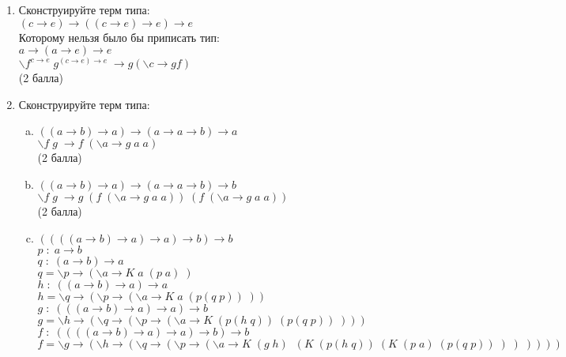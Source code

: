 \documentclass[10pt]{report}
\def\ar{\rightarrow}     %
\def\l{\backslash}       %
\newenvironment{MyList}[1][4pt]{
  \begin{enumerate}[1.]
  \setlength{\parskip}{0pt}
  \setlength{\itemsep}{#1}
}{       
  \end{enumerate}
}
\newcommand{\canonComb}[1]{\boldsymbol{#1}}
\newenvironment{MyList}[1][4pt]{
  \begin{enumerate}[0.]
  \setlength{\parskip}{0pt}
  \setlength{\itemsep}{#1}
}{       
  \end{enumerate}
}
\begin{document}
\begin{MyList}[8pt]
 по Чёрчу :
\begin{enumerate}[a)]
\item $\canonComb{S}\,\canonComb{K}\,\canonComb{K}$\\
$(\l f^{a \ar (b \ar a) \ar a}\; g^{a \ar b \ar a}\; x^{a} \ar f\; x\; (g\; x))(\l x^a\;y^{b\ar a} \ar x)(\l x^a\;y^b \ar x) \; :\; a \ar a$\\
(1 балл)
\item $\canonComb{S}\,\canonComb{K}\,\canonComb{I}$\\
$(\l f^{a \ar a \ar a}\; g^{a \ar a}\; x^{a} \ar f\; x\; (g\; x))(\l x^a\;y^a\ar a} \ar x)(\l x^a \ar x) \; :\; a \ar a$\\
(1 балл)
\end{enumerate}

\item Сконструируйте терм типа:\\
$(c \ar e) \ar ((c \ar e) \ar e) \ar e$\\
Которому нельзя было бы приписать тип:\\
$a \ar (a \ar e) \ar e$\\
$\l f^{c\ar e}\; g^{(c\ar e) \ar e}\; \ar g(\l c \ar gf)$\\
(2 балла)

\item Сконструируйте терм типа:
\begin{enumerate}[a)]
\item $ ((a \ar b) \ar a) \ar (a \ar a \ar b) \ar a$ \\
$\l f\; g\; \ar f\;(\l a \ar g\; a\;a)$\\
(2 балла)
\item $ ((a \ar b) \ar a) \ar (a \ar a \ar b) \ar b$\\
$\l f\; g\; \ar g\; (f\;(\l a \ar g\; a\;a))\; (f\;(\l a \ar g\; a\;a))$\\
(2 балла)
\item $ ((((a \ar b) \ar a) \ar a) \ar b) \ar b$ \\
$p \;:\;a \ar b$\\
$q\;:\;(a \ar b) \ar a$\\
$q = \l p \ar (\l a \ar K\;a\;(p\;a)\;)$\\
$h\;:\;((a \ar b) \ar a) \ar a$\\
$h = \l q \ar(\l p \ar (\l a \ar K\;a\;(p(q\;p))\;))$\\
$g\;:\;(((a \ar b) \ar a) \ar a) \ar b$\\
$g = \l h \ar( \l q \ar(\l p \ar (\l a \ar K\; (p(h\;q))\;(p(q\;p))\;)))$\\
$f\;:\;((((a \ar b) \ar a) \ar a) \ar b)\ar b$\\
$f = \l g \ar (\l h \ar( \l q \ar(\l p \ar (\l a \ar K\; (g\;h)\;\; (K\;(p(h\;q))\;(K\; (p\;a) \;(p(q\;p))\;)\;)\;))))$


\end{enumerate}
\end{MyList}
\end{document}
